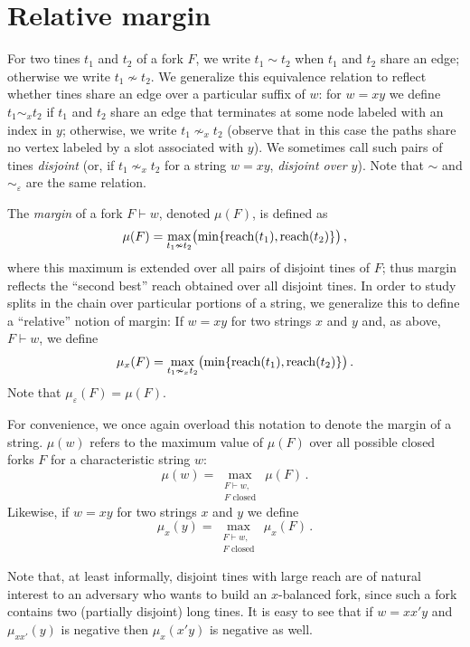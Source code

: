 \section{Relative margin}
\begin{definition}
  For two tines $t_1$ and $t_2$ of a fork $F$, we write $t_1 \sim t_2$
  when $t_1$ and $t_2$ share an edge; otherwise we write
  $t_1 \nsim t_2$. We generalize this equivalence relation to reflect
  whether tines share an edge over a particular suffix of $w$: for
  $w = xy$ we define $t_1 \sim_x t_2$ if $t_1$ and $t_2$ share an edge
  that terminates at some node labeled with an index in $y$;
  otherwise, we write $t_1 \nsim_x t_2$ (observe that in this case the
  paths share no vertex labeled by a slot associated with $y$).  We
  sometimes call such pairs of tines \emph{disjoint} (or, if
  $t_1 \nsim_x t_2$ for a string $w = xy$, \emph{disjoint over
    $y$}). Note that $\sim$ and $\sim_\varepsilon$ are the same
  relation.
\end{definition}

\begin{definition}[Margin]\label{def:margin}
The \emph{margin} of a fork $F\vdash w$, denoted $\mu(F)$, is defined as 
\begin{equation}\label{eq:margin-absolute}
\mu(F)=\underset{t_1\nsim t_2}\max \bigl(\min\{\operatorname{reach}(t_1),\operatorname{reach}(t_2)\}\bigr)\,,
\end{equation}
where this maximum is extended over all pairs of disjoint tines of
$F$; thus margin reflects the ``second best'' reach obtained over all
disjoint tines. In order to study splits in the chain over particular portions of a
string, we generalize this to define a ``relative'' notion of margin:
If $w = xy$ for two strings $x$ and $y$ and, as above, $F \vdash w$,
we define
\[
  \mu_x(F)=\underset{t_1\nsim_x t_2}\max \bigl(\min\{\operatorname{reach}(t_1),\operatorname{reach}(t_2)\}\bigr)\,.
\]
Note that $\mu_\varepsilon(F) = \mu(F)$.

For convenience, we once again overload this notation to denote the
margin of a string. $\mu(w)$ refers to the maximum value of $\mu(F)$
over all possible closed forks $F$ for a characteristic string $w$:
\[
\mu(w)=\underset{\substack{F\vdash w,\\ \text{$F$ closed}}}\max \, \mu(F)\,.
\]
Likewise, if $w = xy$ for two strings $x$ and $y$ we define
\[
\mu_x(y)=\underset{\substack{F\vdash w,\\ \text{$F$ closed}}} \max \, \mu_x(F)\,.
\]
\end{definition}
Note that, at least informally, 
disjoint tines with large reach are of natural
interest to an adversary who wants to build an $x$-balanced fork, 
since such a fork contains two (partially disjoint) long tines.
It is easy to see that 
if $w = xx'y$ and 
$\mu_{xx'}(y)$ is negative then $\mu_x(x'y)$ is negative as well.

